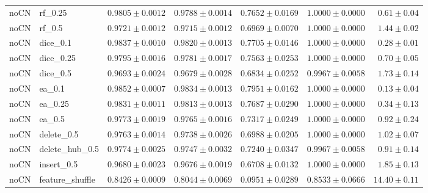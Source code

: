 \documentclass[UTF8,a4paper,11pt,fontset=fandol]{ctexart}
\begin{document}
{\begin{longtable}{llrrrrr}
noCN & rf\_0.25 & $0.9805\pm0.0012$ & $0.9788\pm0.0014$ & $0.7652\pm0.0169$ & $1.0000\pm0.0000$ & $0.61\pm0.04$ \\
noCN & rf\_0.5 & $0.9721\pm0.0012$ & $0.9715\pm0.0012$ & $0.6969\pm0.0070$ & $1.0000\pm0.0000$ & $1.44\pm0.02$ \\
noCN & dice\_0.1 & $0.9837\pm0.0010$ & $0.9820\pm0.0013$ & $0.7705\pm0.0146$ & $1.0000\pm0.0000$ & $0.28\pm0.01$ \\
noCN & dice\_0.25 & $0.9795\pm0.0016$ & $0.9781\pm0.0017$ & $0.7563\pm0.0253$ & $1.0000\pm0.0000$ & $0.70\pm0.05$ \\
noCN & dice\_0.5 & $0.9693\pm0.0024$ & $0.9679\pm0.0028$ & $0.6834\pm0.0252$ & $0.9967\pm0.0058$ & $1.73\pm0.14$ \\
noCN & ea\_0.1 & $0.9852\pm0.0007$ & $0.9834\pm0.0013$ & $0.7951\pm0.0162$ & $1.0000\pm0.0000$ & $0.13\pm0.04$ \\
noCN & ea\_0.25 & $0.9831\pm0.0011$ & $0.9813\pm0.0013$ & $0.7687\pm0.0290$ & $1.0000\pm0.0000$ & $0.34\pm0.13$ \\
noCN & ea\_0.5 & $0.9773\pm0.0019$ & $0.9765\pm0.0016$ & $0.7317\pm0.0249$ & $1.0000\pm0.0000$ & $0.92\pm0.24$ \\
noCN & delete\_0.5 & $0.9763\pm0.0014$ & $0.9738\pm0.0026$ & $0.6988\pm0.0205$ & $1.0000\pm0.0000$ & $1.02\pm0.07$ \\
noCN & delete\_hub\_0.5 & $0.9774\pm0.0025$ & $0.9747\pm0.0032$ & $0.7240\pm0.0347$ & $0.9967\pm0.0058$ & $0.91\pm0.14$ \\
noCN & insert\_0.5 & $0.9680\pm0.0023$ & $0.9676\pm0.0019$ & $0.6708\pm0.0132$ & $1.0000\pm0.0000$ & $1.85\pm0.13$ \\
noCN & feature\_shuffle & $0.8426\pm0.0009$ & $0.8044\pm0.0069$ & $0.0951\pm0.0289$ & $0.8533\pm0.0666$ & $14.40\pm0.11$ \\
\end{longtable}
}
\end{document}
